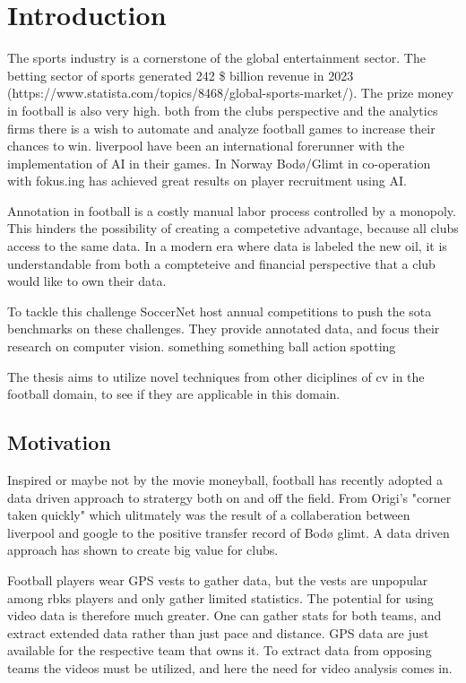 \chapter{Introduction}
\label{chap:intro}

The sports industry is a cornerstone of the global entertainment sector. The betting sector of sports generated 242 \$ billion revenue in 2023 (https://www.statista.com/topics/8468/global-sports-market/). The prize money in football is also very high. both from the clubs perspective and the analytics firms there is a wish to automate and analyze football games to increase their chances to win. liverpool have been an international forerunner with the implementation of AI in their games. In Norway Bodø/Glimt in co-operation with fokus.ing has achieved great results on player recruitment using AI. 

Annotation in football is a costly manual labor process controlled by a monopoly. This hinders the possibility of creating a competetive advantage, because all clubs access to the same data. In a modern era where data is labeled the new oil, it is understandable from both a compteteive and financial perspective that a club would like to own their data. 

To tackle this challenge SoccerNet host annual competitions to push the \acrfull{sota} benchmarks on these challenges. They provide annotated data, and focus their research on computer vision. something something ball action spotting

The thesis aims to utilize novel techniques from other diciplines of \acrlong{cv} in the football domain, to see if they are applicable in this domain. 

\section{Motivation}
Inspired or maybe not by the movie moneyball, football has recently adopted a data driven approach to stratergy both on and off the field. From Origi's "corner taken quickly" which ulitmately was the result of a collaberation between liverpool and google to the positive transfer record of Bodø glimt. A data driven approach has shown to create big value for clubs. 

Football players wear GPS vests to gather data, but the vests are unpopular among \acrshort{rbk}s players and only gather limited statistics. The potential for using video data is therefore much greater. One can gather stats for both teams, and extract extended data rather than just pace and distance. GPS data are just available for the respective team that owns it. To extract data from opposing teams the videos must be utilized, and here the need for video analysis comes in. 

